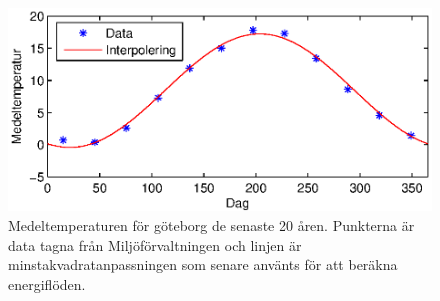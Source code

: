 \begin{figure}
\centering
\includegraphics{images/meantemperature.eps}
\caption{
Medeltemperaturen för göteborg de senaste 20 åren. Punkterna är data tagna från Miljöförvaltningen och linjen är minstakvadratanpassningen som senare använts för att beräkna energiflöden.}
\label{fig:foundation:meantemperature}
\end{figure}

